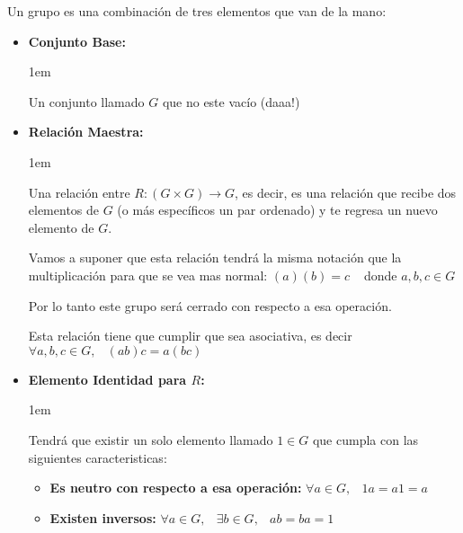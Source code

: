 \documentclass[12pt]{report}                                    %
\newenvironment{SmallIndentation}[1][0.75em]                    %
    {\begin{adjustwidth}{#1}{}\begin{footnotesize}}                 %
    {\end{footnotesize}\end{adjustwidth}}                           %
\DeclareMathOperator \Space {\quad}                             %
\DeclareMathOperator \MiniSpace {\;}                            %
\begin{document}
            Un grupo es una combinación de tres elementos que van de la mano:
            \begin{itemize}
                \item
                    \textbf{Conjunto Base:}

                    \begin{SmallIndentation}[1em]
                        Un conjunto llamado $G$ que no este vacío (daaa!)
                    \end{SmallIndentation}


                \item
                    \textbf{Relación Maestra:}

                    \begin{SmallIndentation}[1em]
                        
                        Una relación entre $R: (G \times  G) \to G$, es decir,
                        es una relación que recibe dos elementos de $G$ (o más
                        específicos un par ordenado) y te regresa un nuevo
                        elemento de $G$.

                        Vamos a suponer que esta relación tendrá la misma notación
                        que la multiplicación para que se vea mas normal:
                        $(a)(b) = c \MiniSpace$ donde $a, b, c \in G$

                        Por lo tanto este grupo será cerrado con respecto a esa
                        operación.

                        Esta relación tiene que cumplir que sea asociativa, es
                        decir $\forall a, b, c \in G, \MiniSpace (ab)c = a(bc)$

                    \end{SmallIndentation}

                

                \item
                    \textbf{Elemento Identidad para $R$:}

                    \begin{SmallIndentation}[1em]
                        Tendrá que existir un solo elemento llamado $1 \in G$
                        que cumpla con las siguientes caracteristicas: 
                        
                        \begin{itemize}
                            \item \textbf{Es neutro con respecto a esa operación:}
                                $\forall a \in G, \MiniSpace 1a = a1 = a$

                            \item \textbf{Existen inversos:}
                                $\forall a \in G, \MiniSpace \exists b \in G, \MiniSpace ab=ba=1$
                        \end{itemize}
                    \end{SmallIndentation}

            \end{itemize}
\end{document}
